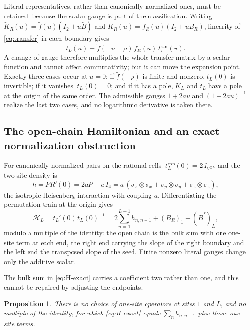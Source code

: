 \documentclass[11pt,reqno]{amsart}
\theoremstyle{plain}
\newtheorem{proposition}[theorem]{Proposition}
\theoremstyle{definition}
\theoremstyle{remark}
\numberwithin{equation}{section}
\newcommand{\Id}{I_2}
\begin{document}
Literal representatives, rather than canonically normalized ones, must be
retained, because the scalar gauge is part of the classification. Writing
$\widetilde K_R(u)=\widetilde f(u)(\Id+u\widetilde B)$ and
$K_R(u)=f_R(u)(\Id+uB_R)$, linearity of \cref{eq:transfer} in each boundary gives
\begin{equation}
t_L(u)=\widetilde f(-u-\rho)\,f_R(u)\,t_L^{\mathrm{can}}(u).
\label{eq:literal-transfer}
\end{equation}
A change of gauge therefore multiplies the whole transfer matrix by a scalar
function and cannot affect commutativity; but it can move the expansion point.
Exactly three cases occur at $u=0$: if $\widetilde f(-\rho)$ is finite and
nonzero, $t_L(0)$ is invertible; if it vanishes, $t_L(0)=0$; and if it has a
pole, $K_L$ and $t_L$ have a pole at the origin of the same order. The admissible
gauges $1+2au$ and $(1+2au)^{-1}$ realize the last two cases, and no logarithmic
derivative is taken there.

\subsection{The open-chain Hamiltonian and an exact normalization obstruction}

For canonically normalized pairs on the rational cells,
$t_L^{\mathrm{can}}(0)=2\,I_{V^{\otimes L}}$ and the two-site density is
\begin{equation}
h=PR'(0)=2aP-a\,I_4
=a\,(\sigma_x\otimes\sigma_x+\sigma_y\otimes\sigma_y+\sigma_z\otimes\sigma_z),
\label{eq:rational-density}
\end{equation}
the isotropic Heisenberg interaction with coupling $a$. Differentiating the
permutation train at the origin gives
\begin{equation}
\mathcal H_L=t_L'(0)\,t_L(0)^{-1}
=2\sum_{n=1}^{L-1}h_{n,n+1}+(B_R)_1-(\widetilde B^{\,t})_L,
             \label{eq:H-exact}
\end{equation}
modulo a multiple of the identity: the open chain is the bulk sum with one
one-site term at each end, the right end carrying the slope of the right boundary
and the left end the transposed slope of the seed. Finite nonzero literal gauges
change only the additive scalar.

The bulk sum in \cref{eq:H-exact} carries a coefficient two rather than one, and
this cannot be repaired by adjusting the endpoints.

\begin{proposition}
\label{prop:normalization}
There is no choice of one-site operators at sites $1$ and $L$, and no multiple of
the identity, for which \cref{eq:H-exact} equals $\sum_n h_{n,n+1}$ plus those
one-site terms.
\end{proposition}
\end{document}
